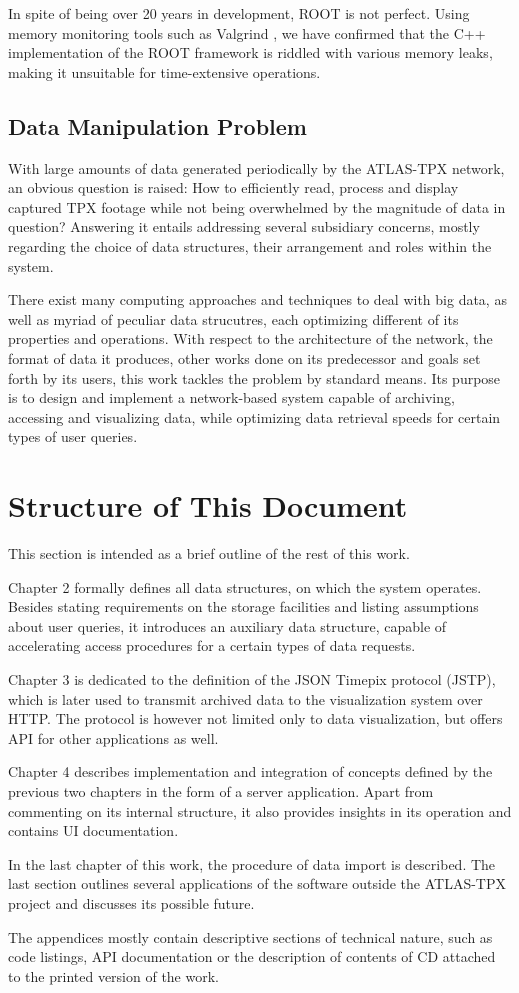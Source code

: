 In spite of being over 20 years in development, ROOT is not perfect. Using memory monitoring tools such as Valgrind \cite{Valgrind}, we have confirmed that the C++ implementation of the ROOT framework is riddled with various memory leaks, making it unsuitable for time-extensive operations.

\subsection{Data Manipulation Problem}
With large amounts of data generated periodically by the ATLAS-TPX network, an obvious question is raised: How to efficiently read, process and display captured TPX footage while not being overwhelmed by the magnitude of data in question? Answering it entails addressing several subsidiary concerns, mostly regarding the choice of data structures, their arrangement and roles within the system.

There exist many computing approaches and techniques to deal with big data, as well as myriad of peculiar data strucutres, each optimizing different of its properties and operations. With respect to the architecture of the network, the format of data it produces, other works done on its predecessor and goals set forth by its users, this work tackles the problem by standard means. Its purpose is to design and implement a network-based system capable of archiving, accessing and visualizing data, while optimizing data retrieval speeds for certain types of user queries.

\section{Structure of This Document}
This section is intended as a brief outline of the rest of this work.

Chapter 2 formally defines all data structures, on which the system operates. Besides stating requirements on the storage facilities and listing assumptions about user queries, it introduces an auxiliary data structure, capable of accelerating access procedures for a certain types of data requests.

Chapter 3 is dedicated to the definition of the JSON Timepix protocol (JSTP), which is later used to transmit archived data to the visualization system over HTTP. The protocol is however not limited only to data visualization, but offers API for other applications as well.

Chapter 4 describes implementation and integration of concepts defined by the previous two chapters in the form of a server application. Apart from commenting on its internal structure, it also provides insights in its operation and contains UI documentation.

In the last chapter of this work, the procedure of data import is described. The last section outlines several applications of the software outside the ATLAS-TPX project and discusses its possible future.

The appendices mostly contain descriptive sections of technical nature, such as code listings, API documentation or the description of contents of CD attached to the printed version of the work.
